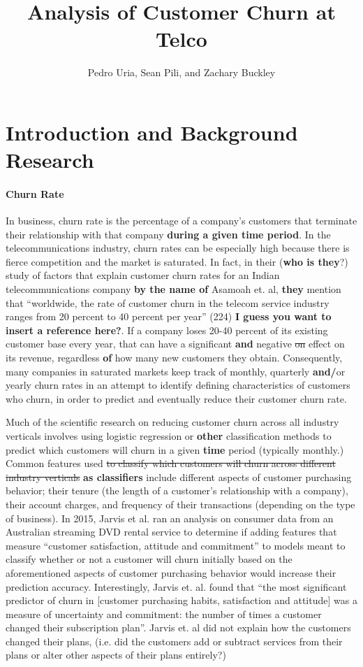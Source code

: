\documentclass[man, floatsintext]{apa6}
\title{Analysis of Customer Churn at Telco}
\author{Pedro Uria, Sean Pili, and Zachary Buckley}
\affiliation{George Washington University}
\begin{document}
\maketitle

\section{Introduction and Background Research}
\paragraph{Churn Rate}

In business, churn rate is the percentage of a company's customers that terminate their relationship with that company \textbf{during a given time period}. In the telecommunications industry, churn rates can be especially high because there is fierce competition and the market is saturated. In fact, in their (\textbf{who is they}?) study of factors that explain customer churn rates for an Indian telecommunications company \textbf{by the name of} Asamoah et. al, \textbf{they} mention that ``worldwide, the rate of customer churn in the telecom service industry ranges from 20 percent to 40 percent per year'' (224) \textbf{I guess you want to insert a reference here?}. If a company loses 20-40 percent of its existing customer base every year, that can have a significant \textbf{and} negative \sout{on} effect on its revenue, regardless \textbf{of} how many new customers they obtain.  Consequently, many companies in saturated markets keep track of monthly, quarterly \textbf{and/}or yearly churn rates in an attempt to identify defining characteristics of customers who churn, in order to predict and eventually reduce their customer churn rate. 

Much of the scientific research on reducing customer churn across all industry verticals involves using logistic regression or \textbf{other} classification methods to predict which customers will churn in a given \textbf{time} period (typically monthly.) Common features used \sout{to classify which customers will churn across different industry verticals} \textbf{as classifiers} include different aspects of customer purchasing behavior; their tenure (the length of a customer's relationship with a company), their account charges,  and frequency of their transactions (depending on the type of business). In 2015, Jarvis et al. ran an analysis on consumer data from an Australian streaming DVD rental service to determine if adding features that measure ``customer satisfaction, attitude and commitment'' to models meant to classify whether or not a customer will churn initially based on the aforementioned aspects of customer purchasing behavior would increase their prediction accuracy.  Interestingly, Jarvis et. al. found that ``the most significant predictor of churn in [customer purchasing habits, satisfaction and attitude] was a measure of uncertainty and commitment: the number of times a customer changed their subscription plan''. Jarvis et. al did not explain how the customers changed their plans, (i.e. did the customers add or subtract services from their plans or alter other aspects of their plans entirely?)  
\end{document}
